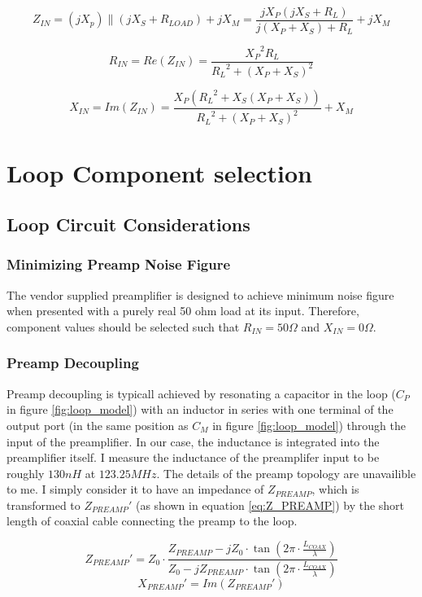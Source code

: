 \begin{equation} \label{eq:Z_IN}
    Z_{IN}=(jX_p)\parallel(jX_S+R_{LOAD})+jX_M = \frac{j X_P (j X_S + R_L)}{j (X_P + X_S) + R_L} + j X_M
\end{equation}

\begin{equation} \label{eq:R_IN}
    R_{IN}=Re(Z_{IN})=\frac{{X_P}^2 R_L}{{R_L}^2+(X_P+X_S)^2}
\end{equation}

\begin{equation} \label{eq:X_IN}
    X_{IN}= Im(Z_{IN}) = \frac{X_P ({R_L}^2 + X_S(X_P+X_S))}{{R_L}^2+(X_P+X_S)^2}+X_M
\end{equation}

\section{Loop Component selection}

\subsection{Loop Circuit Considerations}
\subsubsection{Minimizing Preamp Noise Figure}
The vendor supplied preamplifier is designed to achieve minimum noise figure when presented with a purely real 50 ohm 
load at its input. Therefore, component values should be selected such that $R_{IN}=50\Omega$ and $X_{IN}=0\Omega$.
\subsubsection{Preamp Decoupling}
Preamp decoupling is typicall achieved by resonating a capacitor in the loop ($C_P$ in figure \ref{fig:loop_model}) with
an inductor in series with one terminal of the output port (in the same position as $C_M$ in figure
\ref{fig:loop_model}) through the input of the preamplifier. In our case, the inductance is integrated into the
preamplifier itself. I measure the inductance of the preamplifer input to be roughly $130nH$ at $123.25 MHz$. The
details of the preamp topology are unavailible to me. I simply consider it to have an impedance of $Z_{PREAMP}$, which
is transformed to ${Z_{PREAMP}}'$ (as shown in equation \ref{eq:Z_PREAMP}) by the short length of coaxial cable
connecting the preamp to the loop.

\begin{equation} \label{eq:Z_PREAMP}
    {Z_{PREAMP}}'=Z_0 \cdot \frac{Z_{PREAMP}-j Z_0 \cdot \tan(2\pi\cdot\frac{L_{COAX}}{\lambda})}{Z_0 - j Z_{PREAMP} \cdot
    \tan(2\pi\cdot\frac{L_{COAX}}{\lambda})}
\end{equation}
\begin{equation} \label{eq:X_PREAMP}
    {X_{PREAMP}}'=Im({Z_{PREAMP}}')
\end{equation}
    

